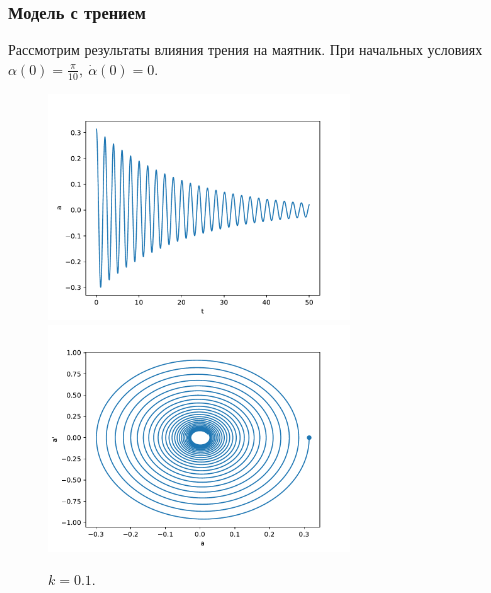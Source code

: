         \subsubsection{Модель с трением}
            Рассмотрим результаты влияния трения на маятник. При начальных условиях \( \alpha(0) = \frac{\pi}{10}, ~ \dot{\alpha}(0) = 0 \).
            \begin{figure}[H]
                \centering
                \includegraphics[width=8cm]{pictures/3resonance1.pdf}
                \includegraphics[width=8cm]{pictures/3resonance1p.pdf}
                \caption{$k = 0.1$.} \label{k01}
            \end{figure}
